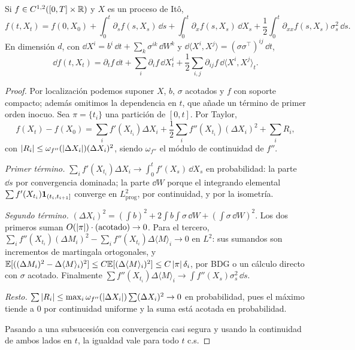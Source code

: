 \begin{teorema}\label{teo:formula-ito}
Si $f\in C^{1,2}([0,T]\times\mathbb{R})$ y $X$ es un proceso de Itô,
\[
  f(t,X_t)=f(0,X_0)+\int_0^t\partial_sf(s,X_s)\,\dd s+\int_0^t\partial_xf(s,X_s)\,\dd X_s+\frac12\int_0^t\partial_{xx}f(s,X_s)\sigma_s^2\,\dd s.
\]
En dimensión $d$, con $\dd X^i=b^i\,\dd t+\sum_k\sigma^{ik}\,\dd W^k$ y $\dd\langle X^i,X^j\rangle=(\sigma\sigma^\top)^{ij}\,\dd t$,
\[
  \dd f(t,X_t)=\partial_tf\,\dd t+\sum_i\partial_if\,\dd X^i_t+\frac12\sum_{i,j}\partial_{ij}f\,\dd\langle X^i,X^j\rangle_t.
\]
\end{teorema}

\begin{proof}
Por localización podemos suponer $X$, $b$, $\sigma$ acotados y $f$ con soporte compacto;
además omitimos la dependencia en $t$, que añade un término de primer orden inocuo. Sea
$\pi=\{t_i\}$ una partición de $[0,t]$. Por Taylor,
\[
  f(X_t)-f(X_0)=\sum_if'(X_{t_i})\Delta X_i+\frac12\sum_if''(X_{t_i})(\Delta X_i)^2+\sum_iR_i,
\]
con $\left\lvert R_i\right\rvert\le\omega_{f''}(\left\lvert \Delta X_i\right\rvert)(\Delta X_i)^2$, siendo $\omega_{f''}$ el módulo de continuidad de $f''$.

\emph{Primer término.} $\sum_if'(X_{t_i})\Delta X_i\to\int_0^tf'(X_s)\,\dd X_s$ en probabilidad: la parte $\dd s$ por convergencia
dominada; la parte $\dd W$ porque el integrando elemental $\sum f'(X_{t_i})\mathbf{1}_{(t_i,t_{i+1}]}$ converge en
$L^2_{\mathrm{prog}}$, por continuidad, y por la isometría.

\emph{Segundo término.} $(\Delta X_i)^2=(\int b)^2+2\int b\int\sigma\,\dd W+(\int\sigma\,\dd W)^2$. Los dos primeros suman
$O(\left\lvert \pi\right\rvert)\cdot(\text{acotado})\to0$. Para el tercero, $\sum_if''(X_{t_i})(\Delta M_i)^2-\sum_if''(X_{t_i})\Delta\langle M\rangle_i\to0$ en
$L^2$: sus sumandos son incrementos de martingala ortogonales, y $\mathbb{E}[((\Delta M_i)^2-\Delta\langle M\rangle_i)^2]\le
C\mathbb{E}[(\Delta\langle M\rangle_i)^2]\le C\left\lvert \pi\right\rvert\delta_i$, por BDG o un cálculo directo con $\sigma$ acotado. Finalmente
$\sum f''(X_{t_i})\Delta\langle M\rangle_i\to\int f''(X_s)\sigma_s^2\,\dd s$.

\emph{Resto.} $\sum\left\lvert R_i\right\rvert\le\max_i\omega_{f''}(\left\lvert \Delta X_i\right\rvert)\sum(\Delta X_i)^2\to0$ en probabilidad, pues el máximo tiende a $0$
por continuidad uniforme y la suma está acotada en probabilidad.

Pasando a una subsucesión con convergencia casi segura y usando la continuidad de ambos
lados en $t$, la igualdad vale para todo $t$ c.s.
\end{proof}


